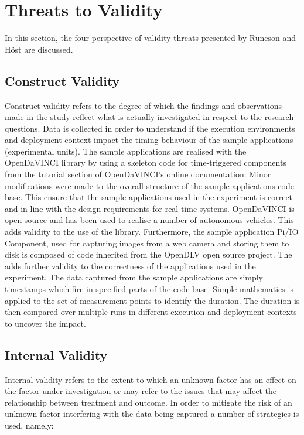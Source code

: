 \iffalse  \fi
\chapter{Threats to Validity}
In this section, the four perspective of validity threats presented by Runeson and H\"{o}st \cite{runeson} are discussed.


\section{Construct Validity}
Construct validity refers to the degree of which the findings and observations made in the study reflect what is actually investigated in respect to the research questions. Data is collected in order to understand if the execution environments and deployment context impact the timing behaviour of the sample applications (experimental units). The sample applications are realised with the OpenDaVINCI library by using a skeleton code for time-triggered components from the tutorial section of OpenDaVINCI's online documentation. Minor modifications were made to the overall structure of the sample applications code base. This ensure that the sample applications used in the experiment is correct and in-line with the design requirements for real-time systems. OpenDaVINCI is open source and has been used to realise a number of autonomous vehicles. This adds validity to the use of the library. Furthermore, the sample application Pi/IO Component, used for capturing images from a web camera and storing them to disk is composed of code inherited from the OpenDLV open source project. The adds further validity to the correctness of the applications used in the experiment. The data captured from the sample applications are simply timestamps which fire in specified parts of the code base. Simple mathematics is applied to the set of measurement points to identify the duration. The duration is then compared over multiple runs in different execution and deployment contexts to uncover the impact.  

\section{Internal Validity}
Internal validity refers to the extent to which an unknown factor has an effect on the factor under investigation or may refer to the issues that may affect the relationship between treatment and outcome. In order to mitigate the risk of an unknown factor interfering with the data being captured a number of strategies is used, namely: \\

